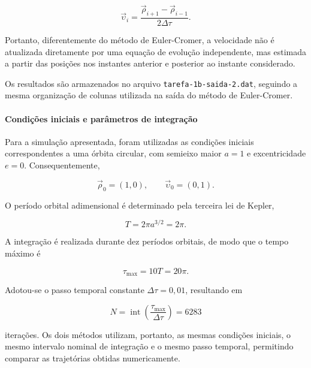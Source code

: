 \documentclass[12pt,a4paper]{article}
\begin{document}
\begin{equation}
    \vec{\upsilon}_i =
    \frac{\vec{\rho}_{i+1}-\vec{\rho}_{i-1}}
    {2\Delta\tau}.
\end{equation}

Portanto, diferentemente do método de Euler-Cromer,
a velocidade não é atualizada diretamente por uma
equação de evolução independente, mas estimada a partir
das posições nos instantes anterior e posterior ao
instante considerado.

Os resultados são armazenados no arquivo
\texttt{tarefa-1b-saida-2.dat}, seguindo a mesma organização
de colunas utilizada na saída do método de Euler-Cromer.

\paragraph{Condições iniciais e parâmetros de integração}

Para a simulação apresentada, foram utilizadas as
condições iniciais correspondentes a uma órbita circular,
com semieixo maior $a=1$ e excentricidade $e=0$.
Consequentemente,

\begin{equation}
    \vec{\rho}_0=(1,0),
    \qquad
    \vec{\upsilon}_0=(0,1).
\end{equation}

O período orbital adimensional é determinado pela
terceira lei de Kepler,

\begin{equation}
    T=2\pi a^{3/2}=2\pi.
\end{equation}

A integração é realizada durante dez períodos orbitais,
de modo que o tempo máximo é

\begin{equation}
    \tau_{\max}=10T=20\pi.
\end{equation}

Adotou-se o passo temporal constante
$\Delta\tau=0,01$, resultando em

\begin{equation}
    N=\operatorname{int}\left(
    \frac{\tau_{\max}}{\Delta\tau}
    \right)=6283
\end{equation}

iterações. Os dois métodos utilizam, portanto, as mesmas
condições iniciais, o mesmo intervalo nominal de
integração e o mesmo passo temporal, permitindo comparar
as trajetórias obtidas numericamente.
\end{document}
